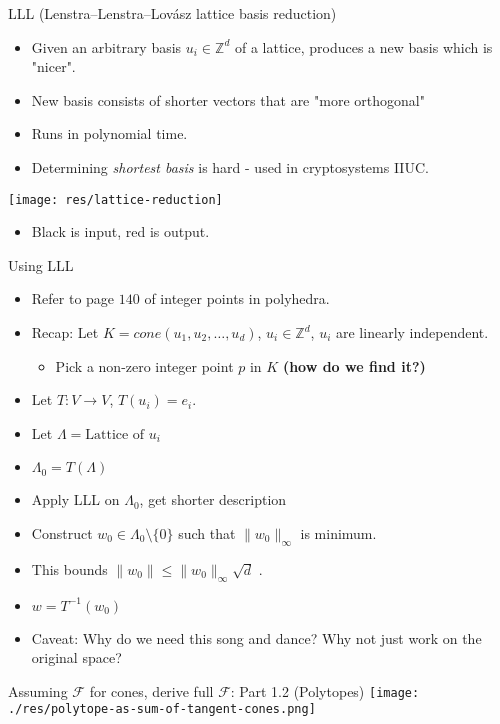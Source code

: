 \documentclass[8pt]{beamer}
\begin{document}
\begin{frame}[label=sec-21]{LLL  (Lenstra–Lenstra–Lovász lattice basis reduction)}
\begin{itemize}
\item Given an arbitrary basis $u_i \in \mathbb{Z}^d$ of a lattice, produces a new basis which is "nicer".
\item New basis consists of shorter vectors that are "more orthogonal"
\item Runs in polynomial time.
\item Determining \textit{shortest basis} is hard - used in cryptosystems IIUC.
\end{itemize}

\begin{center}
\texttt{[image: res/lattice-reduction]}
\end{center}
\begin{itemize}
\item Black is input, red is output.
\end{itemize}
\end{frame}


\begin{frame}[label=sec-22]{Using LLL}
\begin{itemize}
\item Refer to page $140$ of integer points in polyhedra.

\item Recap: Let $K = cone(u_1, u_2, \ldots, u_d)$, $u_i \in \mathbb{Z}^d$, $u_i$ are linearly independent.
\begin{itemize}
\item Pick a non-zero integer point $p$ in $K$ \textbf{(how do we find it?)}
\end{itemize}

\item Let $T: V \rightarrow V$, $T(u_i) = e_i$.
\item Let $\Lambda  = \text{Lattice of } u_i$
\item $\Lambda_0 = T(\Lambda)$
\item Apply LLL on $\Lambda_0$, get shorter description
\item Construct $w_0 \in \Lambda_0 \setminus \{ 0 \}$ such that $\lVert w_0 \rVert_{\infty}$ is minimum.
\item This bounds $\lVert w_0 \rVert  \leq \lVert w_0 \rVert_{\infty} \sqrt{d}$ .
\item $w = T^{-1}(w_0)$
\end{itemize}



\begin{itemize}
\item Caveat: Why do we need this song and dance? Why not just work on the original space?
\end{itemize}
\end{frame}

\begin{frame}[label=sec-23]{Assuming $\mathcal{F}$ for cones, derive full $\mathcal{F}$: Part 1.2 (Polytopes)}
\texttt{[image: ./res/polytope-as-sum-of-tangent-cones.png]}
\end{frame}
\end{document}
